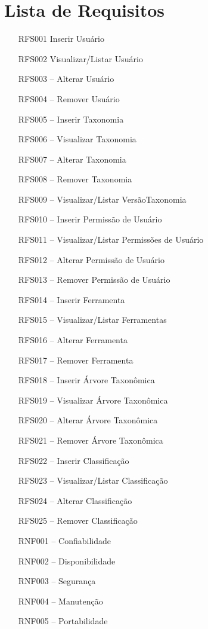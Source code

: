 \chapter{Lista de Requisitos}
\label{apendice:b}

\begin{itemize}
    \item [RFS001] Inserir Usuário
    \item [RFS002] Visualizar/Listar Usuário
    \item [RFS003] – Alterar Usuário
    \item [RFS004] – Remover Usuário
    \item [RFS005] – Inserir Taxonomia
    \item [RFS006] – Visualizar Taxonomia
    \item [RFS007] – Alterar Taxonomia
    \item [RFS008] – Remover Taxonomia
    \item [RFS009] – Visualizar/Listar VersãoTaxonomia
    \item [RFS010] – Inserir Permissão de Usuário
    \item [RFS011] – Visualizar/Listar Permissões de Usuário 
    \item [RFS012] – Alterar Permissão de Usuário
    \item [RFS013] – Remover Permissão de Usuário
    \item [RFS014] – Inserir Ferramenta
    \item [RFS015] – Visualizar/Listar Ferramentas
    \item [RFS016] – Alterar Ferramenta
    \item [RFS017] – Remover Ferramenta
    \item [RFS018] – Inserir Árvore Taxonômica
    \item [RFS019] – Visualizar Árvore Taxonômica
    \item [RFS020] – Alterar Árvore Taxonômica
    \item [RFS021] – Remover Árvore Taxonômica
    \item [RFS022] – Inserir Classificação
    \item [RFS023] – Visualizar/Listar Classificação
    \item [RFS024] – Alterar Classificação
    \item [RFS025] – Remover Classificação
    \item [RNF001] – Confiabilidade
    \item [RNF002] – Disponibilidade
    \item [RNF003] – Segurança
    \item [RNF004] – Manutenção
    \item [RNF005] – Portabilidade
\end{itemize}